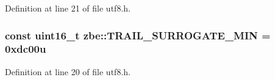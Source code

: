 Definition at line 21 of file utf8.\+h.

\hypertarget{namespacezbe_abe0fe1fa2e911637fa7bbf8df43a50f5}{}
\subsubsection[{T\+R\+A\+I\+L\+\_\+\+S\+U\+R\+R\+O\+G\+A\+T\+E\+\_\+\+M\+I\+N}]{\setlength{\rightskip}{0pt plus 5cm}const uint16\+\_\+t zbe\+::\+T\+R\+A\+I\+L\+\_\+\+S\+U\+R\+R\+O\+G\+A\+T\+E\+\_\+\+M\+I\+N = 0xdc00u}\label{namespacezbe_abe0fe1fa2e911637fa7bbf8df43a50f5}


Definition at line 20 of file utf8.\+h.

